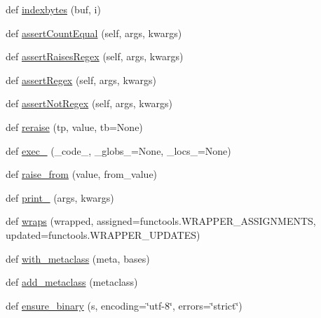 \begin{DoxyCompactItemize}
\item 
def \hyperlink{namespacepip_1_1__vendor_1_1urllib3_1_1packages_1_1six_afc6261b0ec5e681ae932ca19883148b7}{indexbytes} (buf, i)
\item 
def \hyperlink{namespacepip_1_1__vendor_1_1urllib3_1_1packages_1_1six_aab1f9c947d2487a69a2b87de02cd5712}{assert\+Count\+Equal} (self, args, kwargs)
\item 
def \hyperlink{namespacepip_1_1__vendor_1_1urllib3_1_1packages_1_1six_aa9f3a2aeedc5f6061d952b2a81009fdb}{assert\+Raises\+Regex} (self, args, kwargs)
\item 
def \hyperlink{namespacepip_1_1__vendor_1_1urllib3_1_1packages_1_1six_af97eebf776871bab259cfab24588bc31}{assert\+Regex} (self, args, kwargs)
\item 
def \hyperlink{namespacepip_1_1__vendor_1_1urllib3_1_1packages_1_1six_a03ff7324e9973e0c96bb8ec306ce442e}{assert\+Not\+Regex} (self, args, kwargs)
\item 
def \hyperlink{namespacepip_1_1__vendor_1_1urllib3_1_1packages_1_1six_ac3d5f78702f74ad8f02de4fc99609e26}{reraise} (tp, value, tb=None)
\item 
def \hyperlink{namespacepip_1_1__vendor_1_1urllib3_1_1packages_1_1six_abf74c509b706e8e92b4d4bad42923615}{exec\+\_\+} (\+\_\+code\+\_\+, \+\_\+globs\+\_\+=None, \+\_\+locs\+\_\+=None)
\item 
def \hyperlink{namespacepip_1_1__vendor_1_1urllib3_1_1packages_1_1six_a92e3c2348b2b3524dd5131cbb532eaa1}{raise\+\_\+from} (value, from\+\_\+value)
\item 
def \hyperlink{namespacepip_1_1__vendor_1_1urllib3_1_1packages_1_1six_aada32bb31562f25f617f259fb2cccc21}{print\+\_\+} (args, kwargs)
\item 
def \hyperlink{namespacepip_1_1__vendor_1_1urllib3_1_1packages_1_1six_a45ac90c5afe3032dad9e8e42de93f966}{wraps} (wrapped, assigned=functools.\+W\+R\+A\+P\+P\+E\+R\+\_\+\+A\+S\+S\+I\+G\+N\+M\+E\+N\+TS, updated=functools.\+W\+R\+A\+P\+P\+E\+R\+\_\+\+U\+P\+D\+A\+T\+ES)
\item 
def \hyperlink{namespacepip_1_1__vendor_1_1urllib3_1_1packages_1_1six_aff4b1963c0c5076571ba36d584f0f82e}{with\+\_\+metaclass} (meta, bases)
\item 
def \hyperlink{namespacepip_1_1__vendor_1_1urllib3_1_1packages_1_1six_a94117f1460abcd6accd709543e707bc8}{add\+\_\+metaclass} (metaclass)
\item 
def \hyperlink{namespacepip_1_1__vendor_1_1urllib3_1_1packages_1_1six_a1cdd7c825a9d86f7bce57a5223e8d305}{ensure\+\_\+binary} (s, encoding=\char`\"{}utf-\/8\char`\"{}, errors=\char`\"{}strict\char`\"{})

\end{DoxyCompactItemize}
